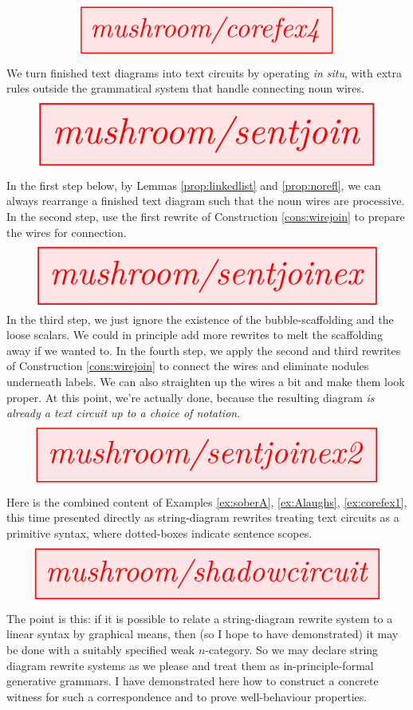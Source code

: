 \begin{myboxR}

\[
\resizebox{0.75\textwidth}{!}{\tikzfig{mushroom/corefex4}}
\]
\end{myboxR}
\clearpage

\clearpage
\vfill

\begin{myboxB}
\begin{rules}\label{cons:wirejoin}
We turn finished text diagrams into text circuits by operating \emph{in situ}, with extra rules outside the grammatical system that handle connecting noun wires.
\[
\resizebox{\textwidth}{!}{\tikzfig{mushroom/sentjoin}} 
\]
\end{rules}
\end{myboxB}

\vfill

\newpage
\clearpage

\vfill

\begin{myboxR}
\begin{example}
In the first step below, by Lemmas \ref{prop:linkedlist} and \ref{prop:norefl}, we can always rearrange a finished text diagram such that the noun wires are processive. In the second step, use the first rewrite of Construction \ref{cons:wirejoin} to prepare the wires for connection.
\[
\resizebox{\textwidth}{!}{\tikzfig{mushroom/sentjoinex}} 
\]
In the third step, we just ignore the existence of the bubble-scaffolding and the loose scalars. We could in principle add more rewrites to melt the scaffolding away if we wanted to. In the fourth step, we apply the second and third rewrites of Construction \ref{cons:wirejoin} to connect the wires and eliminate nodules underneath labels. We can also straighten up the wires a bit and make them look proper. At this point, we're actually done, because the resulting diagram \emph{is already a text circuit up to a choice of notation}.
\[
\resizebox{\textwidth}{!}{\tikzfig{mushroom/sentjoinex2}} 
\]
\end{example}
\end{myboxR}

\begin{myboxB}
\begin{example}\label{ex:directgrowth}
Here is the combined content of Examples \ref{ex:soberA}, \ref{ex:Alaughs}, \ref{ex:corefex1}, this time presented directly as string-diagram rewrites treating text circuits as a primitive syntax, where dotted-boxes indicate sentence scopes.
\[\resizebox{\textwidth}{!}{\tikzfig{mushroom/shadowcircuit}}\]
\end{example}
The point is this: if it is possible to relate a string-diagram rewrite system to a linear syntax by graphical means, then (so I hope to have demonstrated) it may be done with a suitably specified weak $n$-category. So we may declare string diagram rewrite systems as we please and treat them as in-principle-formal generative grammars. I have demonstrated here how to construct a concrete witness for such a correspondence and to prove well-behaviour properties.
\end{myboxB}


